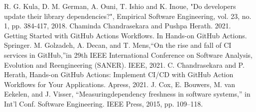 \documentclass[conference]{IEEEtran}
\begin{document}
\begin{thebibliography}{00}
 R. G. Kula, D. M. German, A. Ouni, T. Ishio and K. Inoue, "Do developers update their library dependencies?", Empirical Software Engineering, vol. 23, no. 1, pp. 384-417, 2018.
 Chaminda Chandrasekara and Pushpa Herath. 2021. Getting Started with GitHub Actions Workflows. In Hands-on GitHub Actions. Springer.
 M. Golzadeh, A. Decan, and T. Mens,“On the rise and fall of CI services in GitHub,”in 29th IEEE International Conference on Software Analysis, Evolution and Reengineering (SANER). IEEE, 2021.
 C. Chandrasekara and P. Herath, Hands-on GitHub Actions: Implement CI/CD with GitHub Action Workflows for Your Applications. Apress, 2021.
 J. Cox, E. Bouwers, M. van Eekelen, and J. Visser, “Measuringdependency freshness in software systems,” in Int’l Conf. Software Engineering. IEEE Press, 2015, pp. 109–118.

\end{thebibliography}
\vspace{12pt}
\end{document}
